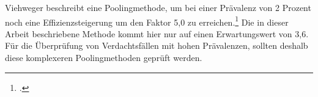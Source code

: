 Viehweger beschreibt eine Poolingmethode, um bei einer Prävalenz von 2 Prozent noch eine Effizienzsteigerung um den Faktor 5,0 zu erreichen.\footcite{viehweger_increased_2020}
Die in dieser Arbeit beschriebene Methode kommt hier nur auf einen Erwartungswert von 3,6.
Für die Überprüfung von Verdachtsfällen mit hohen Prävalenzen, sollten deshalb diese komplexeren Poolingmethoden geprüft werden.
